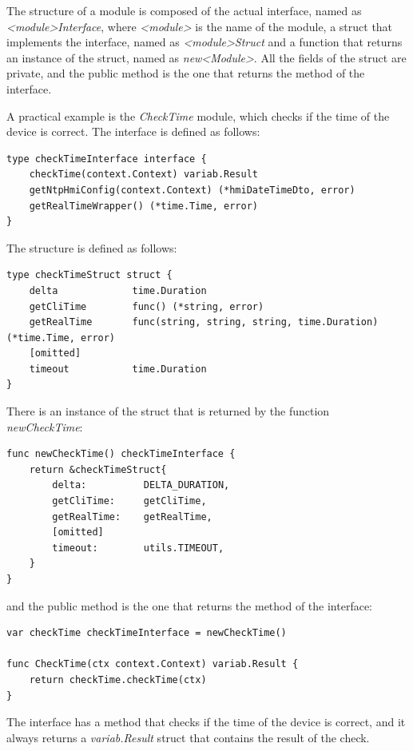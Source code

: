 The structure of a module is composed of the actual interface, named as \textit{<module>Interface}, where \textit{<module>} is the name of the module, a struct that implements the interface, named as \textit{<module>Struct} and a function that returns an instance of the struct, named as \textit{new<Module>}.
All the fields of the struct are private, and the public method is the one that returns the method of the interface.

A practical example is the \textit{CheckTime} module, which checks if the time of the device is correct. The interface is defined as follows:

\begin{lstlisting}[style=golang]
type checkTimeInterface interface {
	checkTime(context.Context) variab.Result
	getNtpHmiConfig(context.Context) (*hmiDateTimeDto, error)
	getRealTimeWrapper() (*time.Time, error)
}
\end{lstlisting}

The structure is defined as follows:

\begin{lstlisting}[style=golang]
type checkTimeStruct struct {
	delta             time.Duration
	getCliTime        func() (*string, error)
	getRealTime       func(string, string, string, time.Duration) (*time.Time, error)
	[omitted]
	timeout           time.Duration
}
\end{lstlisting}

There is an instance of the struct that is returned by the function \textit{newCheckTime}:

\begin{lstlisting}[style=golang]
func newCheckTime() checkTimeInterface {
	return &checkTimeStruct{
		delta:          DELTA_DURATION,
		getCliTime:     getCliTime,
		getRealTime:    getRealTime,
		[omitted]
		timeout:        utils.TIMEOUT,
	}
}
\end{lstlisting}

and the public method is the one that returns the method of the interface:

\begin{lstlisting}[style=golang]
var checkTime checkTimeInterface = newCheckTime()

func CheckTime(ctx context.Context) variab.Result {
	return checkTime.checkTime(ctx)
}
\end{lstlisting}

The interface has a method that checks if the time of the device is correct, and it always returns a \textit{variab.Result} struct that contains the result of the check.

